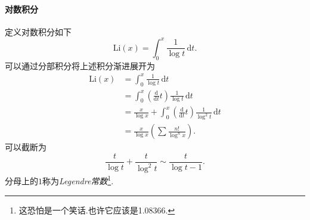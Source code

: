 \documentclass[UTF-8]{ctexart}
\newcommand{\dr}{\mathrm{d}}
\newcommand{\dt}[1]{\frac{\mathrm{d}#1}{\mathrm{d}t}}
\newcommand{\pare}[1]{\left(#1\right)}
\newcommand{\intu}[3]{\int_0^{#1} #2 \, \dr #3}
\begin{document}
  \paragraph{对数积分}定义对数积分如下
  \newcommand{\Li}{\mathrm{Li}}
  \[ \Li\pare{x} = \intu{x}{\frac{1}{\log t}}{t}. \]
  可以通过分部积分将上述积分渐进展开为
  \begin{align*}
    \Li\pare{x} &= \intu{x}{\frac{1}{\log t}}{t} \\
    &= \intu{x}{\pare{\dt{}t}\frac{1}{\log t}}{t} \\
    &= \frac{x}{\log x} + \intu{x}{\pare{\dt{}t}\frac{1}{\log^2 t}}{t}\\
    &= \frac{x}{\log x} \pare{\sum \frac{n!}{\log^n x}}.
  \end{align*}
  可以截断为
  \[ \frac{t}{\log t} + \frac{t}{\log^2 t} \sim \frac{t}{\log t - 1}. \]
  分母上的$1$称为\emph{Legendre常数}\footnote{这恐怕是一个笑话.也许它应该是1.08366.}.
\end{document}
